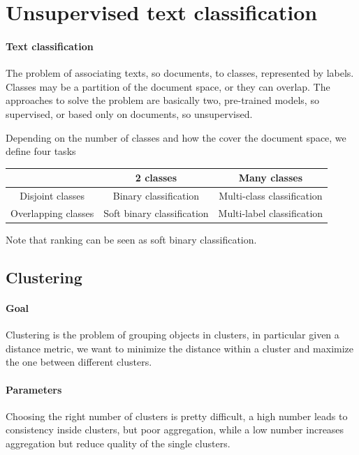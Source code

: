 \section{Unsupervised text classification}
\label{uns-class}

\paragraph{Text classification}
The problem of associating texts, so documents, to classes, represented by labels.
Classes may be a partition of the document space, or they can overlap.
The approaches to solve the problem are basically two, pre-trained models, 
so supervised, or based only on documents, so unsupervised.

Depending on the number of classes and how the cover the document space, we define 
four tasks
\begin{center}
    \begin{tabular}{c | c |c}
            & 2 classes & Many classes\\
            \hline
            Disjoint classes & Binary classification & Multi-class classification\\
            \hline
            Overlapping classes & Soft binary classification & Multi-label classification\\
    \end{tabular}
\end{center}

Note that ranking can be seen as soft binary classification.

\subsection{Clustering}

\paragraph{Goal}
Clustering is the problem of grouping objects in clusters, in particular
given a distance metric, 
we want to minimize the distance within a cluster and maximize the one
between different clusters.

\paragraph{Parameters}
Choosing the right number of clusters is pretty difficult, a high number 
leads to consistency inside clusters, but poor aggregation, while a low number 
increases aggregation but reduce quality of the single clusters.

